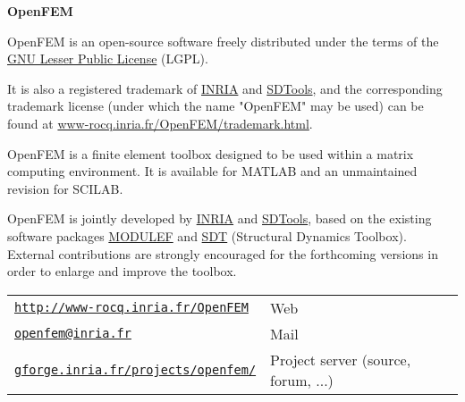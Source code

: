 



{\bf\LARGE OpenFEM}

OpenFEM is an open-source software freely distributed under the terms of the \href{http://www.fsf.org/copyleft/lesser.html}{GNU Lesser Public License} (LGPL). 

It is also a registered trademark of \href{http://www.inria.fr}{INRIA} and \href{http://www.sdtools.com}{SDTools}, 
and the corresponding trademark license  (under which the name "OpenFEM" may be used) can be found at \href{http://www-rocq.inria.fr/OpenFEM/trademark.html}{www-rocq.inria.fr/OpenFEM/trademark.html}.



OpenFEM is a finite element toolbox designed to be used within a matrix computing environment. It is available for MATLAB and an unmaintained revision for SCILAB. 

OpenFEM is jointly developed by \href{http://www.inria.fr}{INRIA} and \href{http://www.sdtools.com}{SDTools}, based on the existing software packages \href{http://www-rocq.inria.fr/modulef/}{MODULEF} and \href{http://www.sdtools.com/sdt/index.html}{SDT} (Structural Dynamics Toolbox). External contributions are strongly encouraged for the forthcoming versions in order to enlarge and improve the toolbox. 
  


\noindent\begin{tabular}{@{}p{}@{}p{}@{}}
%
\href{http://www-rocq.inria.fr/OpenFEM}{{\tt http://www-rocq.inria.fr/OpenFEM}} & Web \\
\href{mailto:openfem@inria.fr}{{\tt openfem@inria.fr}} & Mail \\
\href{https://gforge.inria.fr/projects/openfem/}{{\tt gforge.inria.fr/projects/openfem/}} & Project server (source, forum, ...)\\
\end{tabular}

